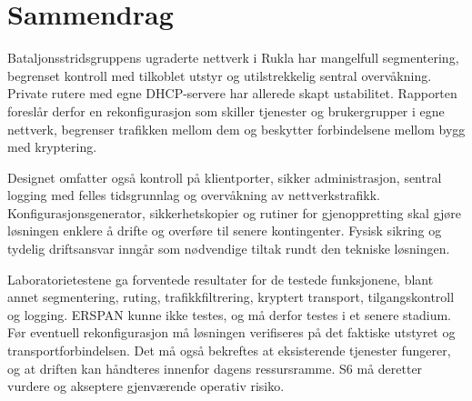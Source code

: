 \begingroup
\setlength{\parindent}{0pt}
\setlength{\parskip}{0.8em}

\section*{Sammendrag}

Bataljonsstridsgruppens ugraderte nettverk i Rukla har mangelfull segmentering, begrenset kontroll med tilkoblet utstyr og utilstrekkelig sentral overvåkning. Private rutere med egne DHCP-servere har allerede skapt ustabilitet. Rapporten foreslår derfor en rekonfigurasjon som skiller tjenester og brukergrupper i egne nettverk, begrenser trafikken mellom dem og beskytter forbindelsene mellom bygg med kryptering.

Designet omfatter også kontroll på klientporter, sikker administrasjon, sentral logging med felles tidsgrunnlag og overvåkning av nettverkstrafikk. Konfigurasjonsgenerator, sikkerhetskopier og rutiner for gjenoppretting skal gjøre løsningen enklere å drifte og overføre til senere kontingenter. Fysisk sikring og tydelig driftsansvar inngår som nødvendige tiltak rundt den tekniske løsningen.

Laboratorietestene ga forventede resultater for de testede funksjonene, blant annet segmentering, ruting, trafikkfiltrering, kryptert transport, tilgangskontroll og logging. ERSPAN kunne ikke testes, og må derfor testes i et senere stadium. Før eventuell rekonfigurasjon må løsningen verifiseres på det faktiske utstyret og transportforbindelsen.  Det må også bekreftes at eksisterende tjenester fungerer, og at driften kan håndteres innenfor dagens ressursramme. S6 må deretter vurdere og akseptere gjenværende operativ risiko.
\par
\endgroup
